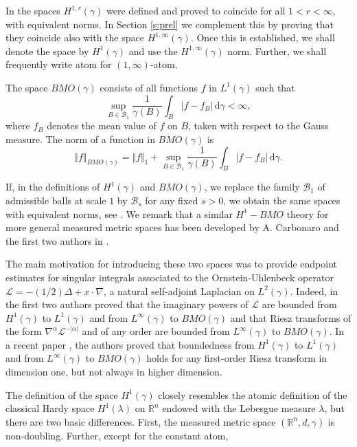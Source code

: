 \documentclass{amsart}                 %
\numberwithin{equation}{section}
\renewcommand\mod[1]{\left\vert{#1}\right\vert}
\newcommand\norm[2]{{\Vert{#1}\Vert_{#2}}}
\newcommand\wrt{\,\mathrm{d}}
\newcommand\1{{\bf 1}}
\newcommand\BR{\mathbb{R}} \newcommand\BRd{\mathbb{R}^d}
\newcommand\cB{\mathcal{B}}  \newcommand\fB{\mathfrak{B}}
\newcommand\cL{\mathcal{L}}  \newcommand\fL{\mathfrak{L}}
\newcommand\ga{\gamma}    \newcommand\Ga{\Gamma}
\newcommand\huat[1]{H^1(#1)}
\begin{document}
In \cite{MM} 
the spaces $H^{1,r}(\gamma)$ were defined and proved to coincide for all 
$1<r<\infty$, with equivalent norms.
In Section \ref{s:prel} we complement this by 
proving that they coincide also with the space $H^{1,\infty}(\gamma)$. 
Once this is established, we shall denote
the space by $H^1(\gamma)$ and use  the $H^{1,\infty}(\gamma)$ norm. 
Further, we shall frequently write atom for $(1,\infty)$-atom.
\par

The space $BMO(\gamma)$ consists of all functions $f$ in $L^1
(\gamma)$ such that
$$
\sup_{B\in\cB_1} \frac{1}{\gamma(B)}\int_B\mod{f-f_B}\wrt \gamma<
\infty,
$$
where  $f_B$ denotes the mean value of $f$ on $B$, taken with respect to 
the Gauss measure. The norm of a function in $BMO(\gamma)$ is
$$
\norm{f}{BMO(\gamma)}=\norm{f}{1}+\sup_{B\in\cB_1} \frac{1}
{\gamma(B)}\int_B\mod{f-f_B}\wrt \gamma.
$$\par
If, in the definitions of $\huat{\gamma}$ and $BMO(\gamma)$, we 
replace the family $\cB_1$ of admissible balls at scale $1$ by $\cB_s$ 
for any fixed $s>0$, we obtain the same spaces with equivalent 
norms, see \cite{MM}. We remark that a similar $H^1-BMO$ theory for 
more general measured metric  spaces has been developed by A. Carbonaro 
and the first two authors in \cite{CMM1, CMM2, CMM3}.\par
The main motivation for introducing these two spaces was to provide 
endpoint estimates for singular integrals associated to the Ornstein-Uhlenbeck 
operator $\cL=-(1/2)\Delta+x\cdot\nabla$, a natural self-adjoint Laplacian  
on $L^2(\gamma)$. Indeed, in \cite{MM} the first 
two authors proved that the imaginary powers of $\cL$ are 
bounded from $\huat{\gamma}$ to $L^1(\gamma)$ and from  $L^\infty
(\gamma)$ to $BMO(\gamma)$ and that  Riesz transforms of the form $\nabla^
\alpha\cL^{-\mod{\alpha}}$ and of any order are bounded from $L^\infty
(\gamma)$ to $BMO(\gamma)$. In a recent 
paper \cite{MMS2}, the authors proved that boundedness from  $\huat{\gamma}$ to 
 $L^1(\gamma)$ and  from  $L^\infty(\gamma)$ to $BMO(\gamma)$
 holds  for any first-order Riesz transform in   dimension one,
but not always in higher dimension.
\par
The definition of the space $\huat{\ga}$ closely resembles the atomic 
definition of the classical Hardy space $H^1(\lambda)$ on $\BR^n$ 
endowed with the Lebesgue measure $\lambda$, but there are two 
basic differences. 
First, the measured metric space $(\BR^n, d, \ga)
$ is non-doubling. Further, except for the constant atom, 
\end{document}
